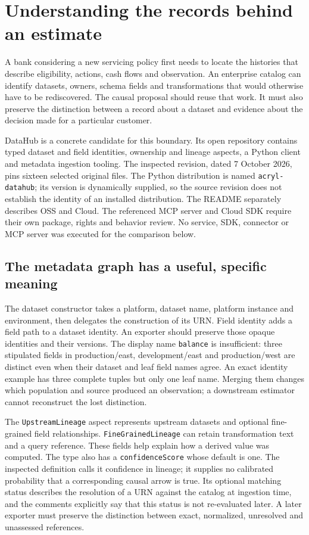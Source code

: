 \chapter{Understanding the records behind an estimate}
\label{exec16:datahub}

A bank considering a new servicing policy first needs to locate the histories
that describe eligibility, actions, cash flows and observation. An enterprise
catalog can identify datasets, owners, schema fields and transformations that
would otherwise have to be rediscovered. The causal proposal should reuse that
work. It must also preserve the distinction between a record about a dataset
and evidence about the decision made for a particular customer.

DataHub is a concrete candidate for this boundary. Its open repository contains
typed dataset and field identities, ownership and lineage aspects, a Python
client and metadata ingestion tooling. The inspected revision, dated 7 October
2026, pins sixteen selected original files. The Python distribution is named
\texttt{acryl-datahub}; its version is dynamically supplied, so the source
revision does not establish the identity of an installed distribution. The
README separately describes OSS and Cloud. The referenced MCP server and
Cloud SDK require their own package, rights and behavior review. No service,
SDK, connector or MCP server was executed for the comparison below.
\citep{exec16_dh_primary,exec16_dh_rights}

\section{The metadata graph has a useful, specific meaning}

The dataset constructor takes a platform, dataset name, platform instance and
environment, then delegates the construction of its URN. Field identity adds
a field path to a dataset identity. An exporter should preserve those opaque
identities and their versions. The display name \texttt{balance} is insufficient:
three stipulated fields in production/east, development/east and production/west
are distinct even when their dataset and leaf field names agree. An exact
identity example has three complete tuples but only one leaf name. Merging
them changes which population and source produced an observation; a downstream
estimator cannot reconstruct the lost distinction.
\citep{exec16_dh_primary,exec16_dh_exact}

The \texttt{UpstreamLineage} aspect represents upstream datasets and optional
fine-grained field relationships. \texttt{FineGrainedLineage} can retain
transformation text and a query reference. These fields help explain how a
derived value was computed. The type also has a \texttt{confidenceScore}
whose default is one. The inspected definition calls it confidence in lineage;
it supplies no calibrated probability that a corresponding causal arrow is
true. Its optional matching status describes the resolution of a URN against
the catalog at ingestion time, and the comments explicitly say that this
status is not re-evaluated later. A later exporter must preserve the distinction
between exact, normalized, unresolved and unassessed references.
\citep{exec16_dh_primary}

